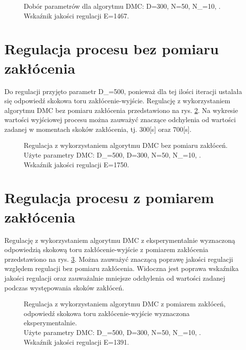 \documentclass[a4paper,titlepage,11pt,twosides,floatssmall]{mwrep}
\begin{document}
\begin{figure}[H]
	\centering
	
	\caption{Dobór parametrów dla algorytmu DMC: D=300, N=50, N_{}=10, .\\ Wskaźnik jakości regulacji E=1467.}
	\label{dobor_param_DMC2}
\end{figure}

\section{Regulacja procesu bez pomiaru zakłócenia}
Do regulacji przyjęto parametr D_{}=500, ponieważ dla tej ilości iteracji ustalała się odpowiedź skokowa toru zakłócenie-wyjście. Regulację z wykorzystaniem algorytmu DMC bez pomiaru zakłócenia przedstawiono na rys. \ref{bez_kom_1}. Na wykresie wartości wyjściowej procesu można zauważyć znaczące odchylenia od wartości zadanej w momentach skoków zakłócenia, tj. 300[s] oraz 700[s].

\begin{figure}[H]
	\centering
	
	\caption{Regulacja z wykorzystaniem algorytmu DMC bez pomiaru zakłóceń. \\Użyte parametry DMC: D_{}=500, D=300, N=50, N_{}=10, .\\ Wskaźnik jakości regulacji E=1750.}
	\label{bez_kom_1}
\end{figure}

\section{Regulacja procesu z pomiarem zakłócenia}

Regulację z wykorzystaniem algorytmu DMC z eksperymentalnie wyznaczoną odpowiedzią skokową toru zakłócenie-wyjście z pomiarem zakłócenia przedstawiono na rys. \ref{kom_s_eksp}. Można zauważyć znaczącą poprawę jakości regulacji względem regulacji bez pomiaru zakłócenia. Widoczna jest poprawa wskaźnika jakości regulacji oraz zauważalnie mniejsze odchylenia od wartości zadanej podczas występowania skoków zakłóceń.

\begin{figure}[H]
	\centering
	
	\caption{Regulacja z wykorzystaniem algorytmu DMC z pomiarem zakłóceń, odpowiedź skokowa toru zakłócenie-wyjście wyznaczona eksperymentalnie. \\Użyte parametry DMC: D_{}=500, D=300, N=50, N_{}=10, .\\ Wskaźnik jakości regulacji E=1391.}
	\label{kom_s_eksp}
\end{figure}
\end{document}
